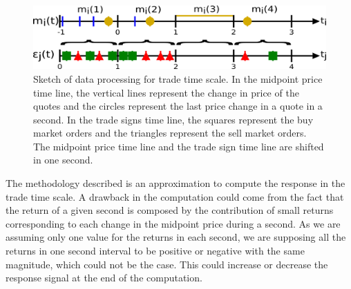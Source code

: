 \begin{figure}[htbp]
    \centering
    \includegraphics[width=\columnwidth]
    {figures/02_relation_trades_quotes_trade_scale.png}
    \caption{Sketch of data processing for trade time scale. In the midpoint
             price time line, the vertical lines represent the change in price
             of the quotes and the circles represent the last price change in a
             quote in a second. In the trade signs time line, the squares
             represent the buy market orders and the triangles represent the
             sell market orders. The midpoint price time line and the trade
             sign time line are shifted in one second.}
    \label{fig:relation_trades_midpoint_trade_scale}
\end{figure}

The methodology described is an approximation to compute the response in the
trade time scale. A drawback in the computation could come from the fact that
the return of a given second is composed by the contribution of small returns
corresponding to each change in the midpoint price during a second. As we are
assuming only one value for the returns in each second, we are supposing  all
the returns in one second interval to be positive or negative with the same
magnitude, which could not be the case. This could increase or decrease the
response signal at the end of the computation.

